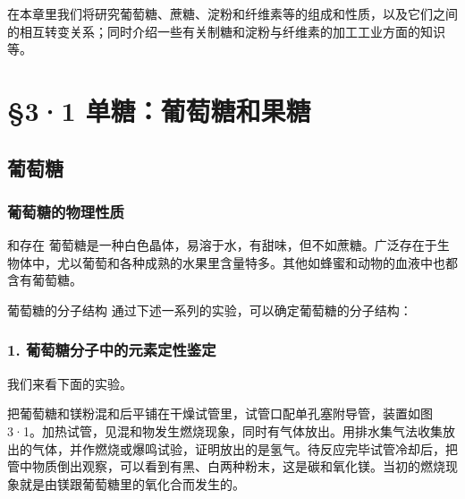 在本章里我们将研究葡萄糖、蔗糖、淀粉和纤维素等的组成和性质，以及它们之间的相互转变关系；同时介绍一些有关制糖和淀粉与纤维素的加工工业方面的知识等。

\section{§3·1 单糖：葡萄糖和果糖}

\subsection{葡萄糖}

\subsubsection{葡萄糖的物理性质}

和存在
葡萄糖是一种白色晶体，易溶于水，有甜味，但不如蔗糖。广泛存在于生物体中，尤以葡萄和各种成熟的水果里含量特多。其他如蜂蜜和动物的血液中也都含有葡萄糖。

葡萄糖的分子结构 通过下述一系列的实验，可以确定葡萄糖的分子结构：

\subsubsection{1. 葡萄糖分子中的元素定性鉴定}

我们来看下面的实验。

把葡萄糖和镁粉混和后平铺在干燥试管里，试管口配单孔塞附导管，装置如图3·1。加热试管，见混和物发生燃烧现象，同时有气体放出。用排水集气法收集放出的气体，并作燃烧或爆鸣试验，证明放出的是氢气。待反应完毕试管冷却后，把管中物质倒出观察，可以看到有黑、白两种粉末，这是碳和氧化镁。当初的燃烧现象就是由镁跟葡萄糖里的氧化合而发生的。

